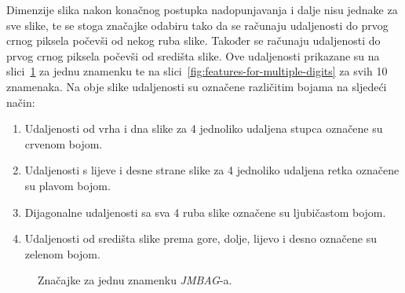 Dimenzije slika nakon konačnog postupka nadopunjavanja i dalje nisu jednake za sve slike, te se stoga značajke odabiru
tako da se računaju udaljenosti do prvog crnog piksela počevši od nekog ruba slike. Također se računaju udaljenosti do
prvog crnog piksela počevši od središta slike. Ove udaljenosti prikazane su na
slici\ \ref{fig:features-for-single-digit} za jednu znamenku te na slici\ \ref{fig:features-for-multiple-digits} za svih
10 znamenaka. Na obje slike udaljenosti su označene različitim bojama na sljedeći način:
\begin{enumerate}
    \item Udaljenosti od vrha i dna slike za 4 jednoliko udaljena stupca označene su crvenom bojom.
    \item Udaljenosti s lijeve i desne strane slike za 4 jednoliko udaljena retka označene su plavom bojom.
    \item Dijagonalne udaljenosti sa sva 4 ruba slike označene su ljubičastom bojom.
    \item Udaljenosti od središta slike prema gore, dolje, lijevo i desno označene su zelenom bojom.
\end{enumerate}
\begin{figure}[htb]
    \centering
    \caption{Značajke za jednu znamenku \emph{JMBAG}-a.}
    \label{fig:features-for-single-digit}
\end{figure}
